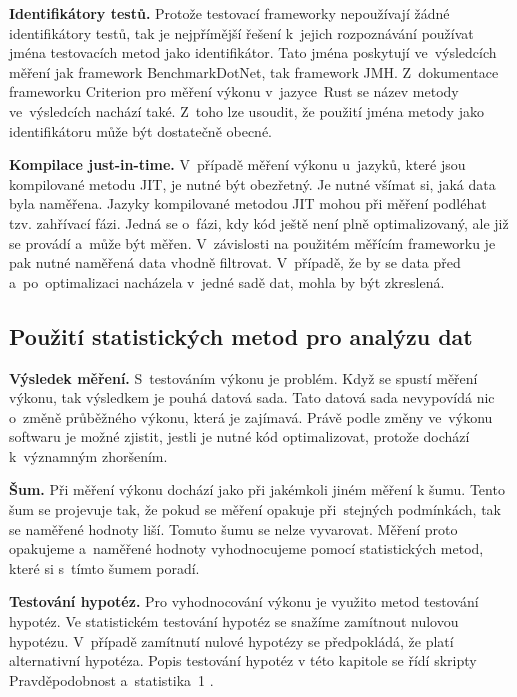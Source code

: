 \medskip

\noindent\textbf{Identifikátory testů.} Protože testovací frameworky nepoužívají žádné identifikátory testů, tak je nejpřímější
řešení k~jejich rozpoznávání používat jména testovacích metod jako identifikátor. Tato jména poskytují ve~výsledcích
měření jak framework BenchmarkDotNet, tak framework JMH. Z~dokumentace frameworku Criterion \cite[]{criterion}
pro měření výkonu v~jazyce~Rust se název metody ve~výsledcích nachází také. Z~toho lze
usoudit, že použití jména metody jako identifikátoru může být dostatečně obecné.

\medskip

\noindent\textbf{Kompilace just-in-time.} V~případě měření výkonu u~jazyků, které jsou kompilované metodu JIT, je nutné být obezřetný. Je nutné
všímat si, jaká data byla naměřena. Jazyky kompilované metodou JIT mohou při měření podléhat tzv. zahřívací
fázi. Jedná se o~fázi, kdy kód ještě není plně optimalizovaný, ale již se provádí a~může být měřen.
V~závislosti na použitém měřícím frameworku je pak nutné naměřená data vhodně filtrovat. V~případě, že
by se data před a~po~optimalizaci nacházela v~jedné sadě dat, mohla by být zkreslená.

\subsection{Použití statistických metod pro analýzu dat}

\noindent\textbf{Výsledek měření.} S~testováním výkonu je problém. Když se spustí měření výkonu, tak výsledkem je pouhá
datová sada. Tato datová sada nevypovídá nic o~změně průběžného výkonu, která
je zajímavá. Právě podle změny ve~výkonu softwaru je možné zjistit, jestli je nutné
kód optimalizovat, protože dochází k~významným zhoršením.

\medskip

\noindent\textbf{Šum.} Při měření výkonu dochází jako při jakémkoli jiném měření k šumu. Tento šum se projevuje
tak, že pokud se měření opakuje při~stejných podmínkách, tak se naměřené hodnoty liší.
Tomuto šumu se nelze vyvarovat. Měření proto opakujeme a~naměřené hodnoty vyhodnocujeme
pomocí statistických metod, které si s~tímto šumem poradí.

\medskip

\noindent\textbf{Testování hypotéz.} Pro vyhodnocování výkonu je využito metod testování hypotéz. Ve statistickém testování
hypotéz se snažíme zamítnout nulovou hypotézu. V~případě zamítnutí nulové hypotézy
se předpokládá, že platí alternativní hypotéza. Popis testování hypotéz v této kapitole
se řídí skripty Pravděpodobnost a~statistika~1 \cite[]{samal_nmai059_nodate}.

